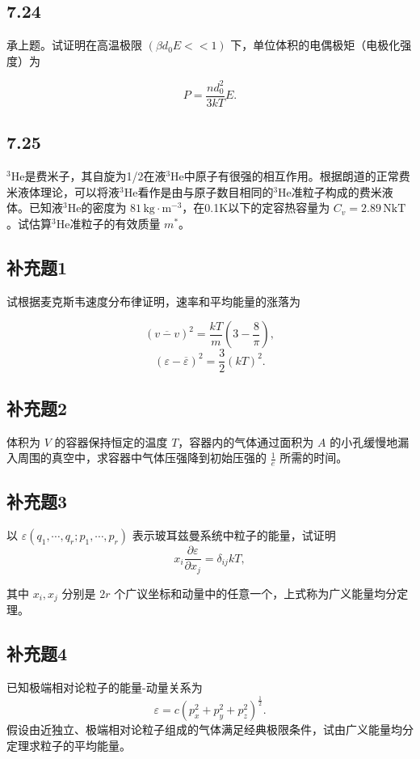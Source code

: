 \newpage
\subsection{7.24}
承上题。试证明在高温极限 $(\beta d_0 E << 1)$ 下，单位体积的电偶极矩（电极化强度）为

$$ P = \frac{n d_0^2}{3kT} E. $$

\newpage
\subsection{7.25}
$^3$He是费米子，其自旋为1/2在液$^3$He中原子有很强的相互作用。根据朗道的正常费米液体理论，可以将液$^3$He看作是由与原子数目相同的$^3$He准粒子构成的费米液体。已知液$^3$He的密度为 $81 \, \text{kg} \cdot \text{m}^{-3}$，在0.1K以下的定容热容量为 $C_v = 2.89 \, \text{NkT}$。试估算$^3$He准粒子的有效质量 $m^*$。

\newpage
\subsection{补充题1}
试根据麦克斯韦速度分布律证明，速率和平均能量的涨落为

$$ \left( \overline{v - v} \right)^2 = \frac{kT}{m} \left( 3 - \frac{8}{\pi} \right), $$
$$ \left( \varepsilon - \overline{\varepsilon} \right)^2 = \frac{3}{2} (kT)^2. $$

\newpage
\subsection{补充题2}
体积为 $V$ 的容器保持恒定的温度 $T$，容器内的气体通过面积为 $A$ 的小孔缓慢地漏入周围的真空中，求容器中气体压强降到初始压强的 $\frac{1}{e}$ 所需的时间。

\newpage
\subsection{补充题3}
以 $ \varepsilon(q_1, \cdots, q_r; p_1, \cdots, p_r) $ 表示玻耳兹曼系统中粒子的能量，试证明
$$ x_i \frac{\partial \varepsilon}{\partial x_j} = \delta_{ij} kT, $$

其中 $ x_i, x_j $ 分别是 $ 2r $ 个广议坐标和动量中的任意一个，上式称为广义能量均分定理。

\newpage
\subsection{补充题4}
已知极端相对论粒子的能量-动量关系为
$$ \varepsilon = c \left( p_x^2 + p_y^2 + p_z^2 \right)^{\frac{1}{2}}. $$
假设由近独立、极端相对论粒子组成的气体满足经典极限条件，试由广义能量均分定理求粒子的平均能量。

